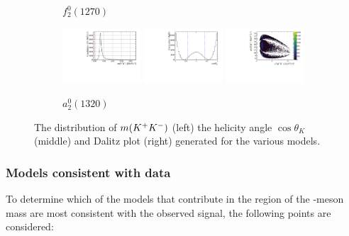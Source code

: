 \begin{figure}[!h]
\begin{subfigure}[t]{1.0\textwidth}
        \caption{$f_{2}^{0}(1270)$} 
    \end{subfigure}
    \begin{subfigure}[t]{1.0\textwidth}
        \includegraphics[width=0.32\textwidth]{figs/B2DsPhi/a2_1320_phi_mass.pdf}
        \includegraphics[width=0.32\textwidth]{figs/B2DsPhi/a2_1320_Helicity.pdf}
        \includegraphics[width=0.32\textwidth]{figs/B2DsPhi/a2_1320_Dalitz_plot.pdf}
        \caption{$a_{2}^{0}(1320)$} 
    \end{subfigure}
    \caption{The distribution of $m({{K}^+}{{K}^-})$ (left) the helicity angle $\cos\theta_{K}$ (middle) and Dalitz plot (right) generated for the various models.}
    \label{fig:B2DsKK_models_2}
\end{figure}






\subsubsection{Models consistent with data}

To determine which of the models that contribute in the region of the \phiz-meson mass are most consistent with the observed signal, the following points are considered: 

